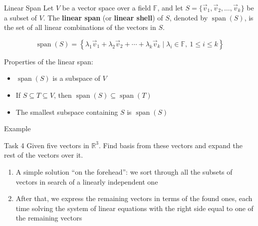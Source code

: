 \documentclass[fullscreen=true, bookmarks=true, hyperref={pdfencoding=unicode}]{beamer}
\begin{document}
\begin{frame}{Linear Span}
  Let $V$ be a vector space over a field $\mathbb{F}$, and 
  let $S = \{\vec{v}_1, \vec{v}_2, \dots, \vec{v}_k\}$ be a subset of $V$. 
  The \textbf{linear span} (or \textbf{linear shell}) of $S$, 
  denoted by $\operatorname{span}(S)$, is the set of 
  all linear combinations of the vectors in $S$. 

  \[
      \operatorname{span}(S) = \left\{\lambda_1\vec{v}_1 + \lambda_2\vec{v}_2 
      + \cdots + \lambda_k\vec{v}_k \mid \lambda_i \in \mathbb{F},\  
      1 \leq i \leq k\right\}
  \]

  \pause
  Properties of the linear span:
  \begin{itemize}
      \item $\operatorname{span}(S)$ is a subspace of $V$
      \item If $S \subseteq T \subseteq V$, then $\operatorname{span}(S) \subseteq \operatorname{span}(T)$
      \item The smallest subspace containing $S$ is $\operatorname{span}(S)$
  \end{itemize}
\end{frame}


\begin{frame}{Example}
  \begin{block}{Task 4}
    Given five vectors in $\mathbb{R}^3$. 
    Find basis from these vectors and expand the rest of the vectors over it.
  \end{block}
  \pause
  \begin{enumerate}
    \item A simple solution ``on the forehead'': 
    we sort through all the subsets of vectors in search of 
    a linearly independent one
    \pause
    \item After that, we express the remaining vectors in terms of 
    the found ones, each time solving the system of linear equations 
    with the right side equal to one of the remaining vectors
  \end{enumerate}

\end{frame}
\end{document}
